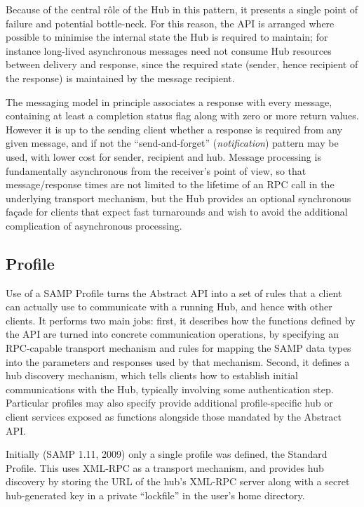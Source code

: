 \documentclass[5p]{elsarticle}
\begin{document}
Because of the central r\^{o}le of the Hub in this pattern,
it presents a single point of failure and potential bottle-neck.
For this reason, the API is arranged where possible
to minimise the internal state the Hub is required to maintain;
for instance long-lived asynchronous messages need not consume
Hub resources between delivery and response, since the required
state (sender, hence recipient of the response) is maintained
by the message recipient.

The messaging model in principle associates
a response with every message, containing at least a completion
status flag along with zero or more return values.
However it is up to the sending client whether a response is
required from any given message, and if not the ``send-and-forget''
({\em notification\/}) pattern may be used,
with lower cost for sender, recipient and hub.
Message processing is fundamentally asynchronous from the
receiver's point of view, so that message/response times are
not limited to the lifetime of an RPC call in the underlying
transport mechanism, but the Hub provides an optional synchronous
fa\c{c}ade for clients that expect fast turnarounds and wish to
avoid the additional complication of asynchronous processing.

\subsection{Profile}

Use of a SAMP Profile turns the Abstract API into a set of rules
that a client can actually use to communicate with a running Hub,
and hence with other clients.
It performs two main jobs: first, it describes
how the functions defined by the API are turned into concrete
communication operations, by specifying an RPC-capable
transport mechanism and rules for mapping the SAMP
data types into the parameters and responses used by that mechanism.
Second, it defines a hub discovery mechanism,
which tells clients how to establish initial communications with the Hub,
typically involving some authentication step.
Particular profiles may also specify provide additional
profile-specific hub or client services exposed as functions
alongside those mandated by the Abstract API.

Initially (SAMP 1.11, 2009)
only a single profile was defined, the Standard Profile.
This uses XML-RPC as a transport mechanism,
and provides hub discovery by storing the URL of the hub's XML-RPC server
along with a secret hub-generated key in a private ``lockfile''
in the user's home directory.
\end{document}
